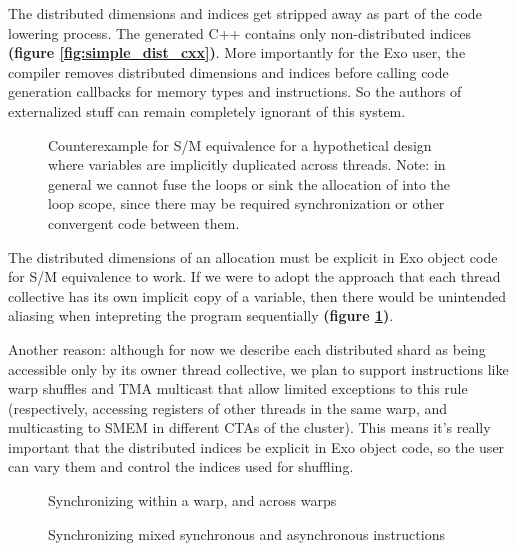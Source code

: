 \filbreak
{} The distributed dimensions and indices get stripped away as part of the code lowering process.
The generated C++ contains only non-distributed indices \textbf{(figure \ref{fig:simple_dist_cxx})}.
More importantly for the Exo user, the compiler removes distributed dimensions and indices before calling code generation callbacks for memory types and instructions.
So the authors of externalized stuff can remain completely ignorant of this system.

\begin{figure}[!b]

\caption{Counterexample for S/M equivalence for a hypothetical design where variables are implicitly duplicated across threads. Note: in general we cannot fuse the  loops or sink the allocation of  into the loop scope, since there may be required synchronization or other convergent code between them.}
\label{fig:why_dist}
\end{figure}

\filbreak
{} The distributed dimensions of an allocation must be explicit in Exo object code for S/M equivalence to work.
If we were to adopt the approach that each thread collective has its own implicit copy of a variable, then there would be unintended aliasing when intepreting the program sequentially \textbf{(figure \ref{fig:why_dist})}.

\filbreak
Another reason: although for now we describe each distributed shard as being accessible only by its owner thread collective, we plan to support instructions like warp shuffles and TMA multicast that allow limited exceptions to this rule (respectively, accessing registers of other threads in the same warp, and multicasting to SMEM in different CTAs of the cluster).
This means it's really important that the distributed indices be explicit in Exo object code, so the user can vary them and control the indices used for shuffling.

\filbreak
{}

\begin{figure}[b!]

\caption{Synchronizing within a warp, and across warps}
\label{fig:sync_warp_cta}
\end{figure}

\begin{figure}[b!]

\caption{Synchronizing mixed synchronous and asynchronous instructions}
\label{fig:Sm80_cp_async_simple}
\end{figure}

